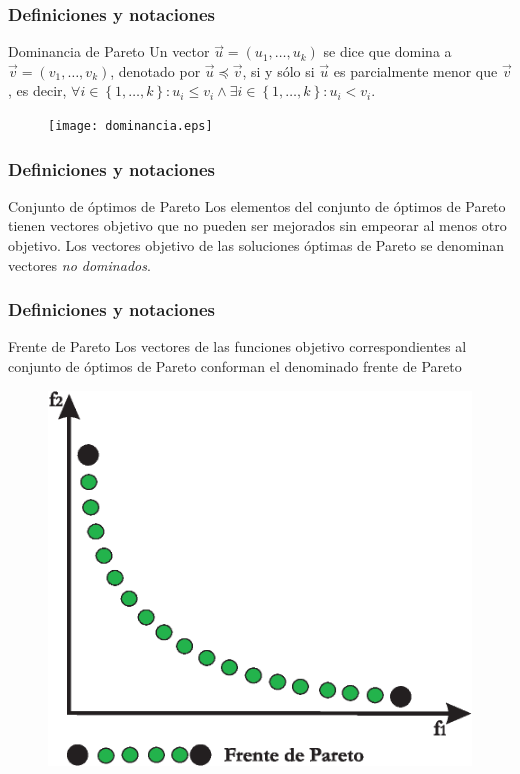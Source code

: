 \documentclass[10pt,compress]{beamer}
\begin{document}
\begin{frame}
	\frametitle{Definiciones y notaciones}
	\begin{block}{Dominancia de Pareto}
	Un vector $\vec{u} = \left(u_1, \ldots, u_k \right)$ se dice que domina a $\vec{v} = \left(v_1, \ldots, v_k \right)$,
	  denotado por $\vec{u} \preceq \vec{v}$, si y s\'olo si $\vec{u}$ es parcialmente menor que $\vec{v}$, es decir, 
	  $\forall i \in \left\{1, \ldots, k \right\}: u_i \leq v_i \wedge \exists i \in \left\{1, \ldots, k\right\}: u_i < v_i$.
	\end{block}
		\begin{figure}[h!]
			\centering
				\texttt{[image: dominancia.eps]}
			
     \end{figure}	
\end{frame}
\begin{frame}
	\frametitle{Definiciones y notaciones}	
	\begin{block}{Conjunto de \'optimos de Pareto}
	Los elementos del conjunto de \'optimos de Pareto tienen vectores objetivo que no pueden ser mejorados sin empeorar al menos otro
  objetivo. Los vectores objetivo de las soluciones \'optimas de Pareto se denominan vectores \textit{no dominados}. 	
	\end{block}
\end{frame}
\begin{frame}
	\frametitle{Definiciones y notaciones}
	\begin{block}{Frente de Pareto} 
	Los vectores de las funciones objetivo correspondientes al conjunto de \'optimos de Pareto conforman el denominado frente de Pareto  	
	\end{block}
	
	\begin{figure}[h!]
			\centering
				\includegraphics[scale=0.4]{frenteP.eps}
				
     \end{figure}	
\end{frame}
\end{document}
